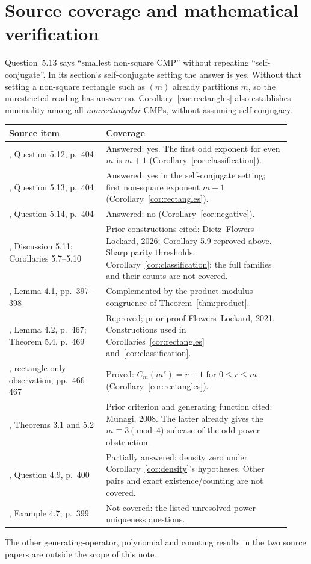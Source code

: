 \documentclass[11pt]{article}
\begin{document}
\section{Source coverage and mathematical verification}
Question~5.13 says ``smallest non-square CMP'' without repeating
``self-conjugate''. In its section's self-conjugate setting the answer
is yes. Without that setting a non-square rectangle such as $(m)$
already partitions $m$, so the unrestricted reading has answer no.
Corollary~\ref{cor:rectangles} also establishes minimality among all
\emph{nonrectangular} CMPs, without assuming self-conjugacy.
\begin{center}
\small
\begin{tabular}{@{}p{0.32\linewidth}p{0.61\linewidth}@{}}
\toprule
Source item & Coverage\\\midrule
\cite{DFL}, Question 5.12, p.~404 & Answered: yes. The first odd
exponent for even $m$ is $m+1$ (Corollary~\ref{cor:classification}).\\[3pt]
\cite{DFL}, Question 5.13, p.~404 & Answered: yes in the self-conjugate
setting; first non-square exponent $m+1$ (Corollary~\ref{cor:rectangles}).\\[3pt]
\cite{DFL}, Question 5.14, p.~404 & Answered: no
(Corollary~\ref{cor:negative}).\\[3pt]
\cite{DFL}, Discussion 5.11; Corollaries 5.7--5.10 & Prior constructions
cited: Dietz--Flowers--Lockard, 2026; Corollary 5.9 reproved above.
Sharp parity thresholds: Corollary~\ref{cor:classification}; the full
families and their counts are not covered.\\[3pt]
\cite{DFL}, Lemma 4.1, pp.~397--398 & Complemented by the product-modulus
congruence of Theorem~\ref{thm:product}.\\[3pt]
\cite{FL}, Lemma 4.2, p.~467; Theorem 5.4, p.~469 & Reproved; prior
proof Flowers--Lockard, 2021. Constructions used in
Corollaries~\ref{cor:rectangles} and~\ref{cor:classification}.\\[3pt]
\cite{FL}, rectangle-only observation, pp.~466--467 & Proved:
$C_m(m^r)=r+1$ for $0\leq r\leq m$ (Corollary~\ref{cor:rectangles}).\\[3pt]
\cite{Munagi}, Theorems 3.1 and 5.2 & Prior criterion and generating
function cited: Munagi, 2008. The latter already gives the
$m\equiv3\pmod4$ subcase of the odd-power obstruction.\\[3pt]
\cite{DFL}, Question 4.9, p.~400 & Partially answered: density zero
under Corollary~\ref{cor:density}'s hypotheses. Other pairs and exact
existence/counting are not covered.\\[3pt]
\cite{DFL}, Example 4.7, p.~399 & Not covered: the listed unresolved
power-uniqueness questions.\\\bottomrule
\end{tabular}
\end{center}
The other generating-operator, polynomial and counting results in the
two source papers are outside the scope of this note.
\end{document}
